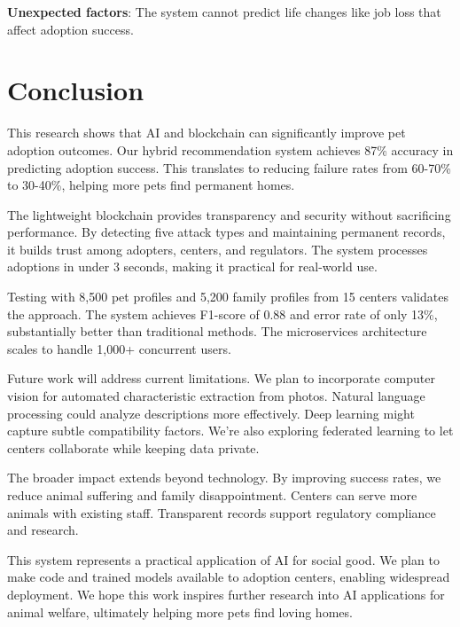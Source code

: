 \documentclass[conference]{IEEEtran}
\begin{document}
\textbf{Unexpected factors}: The system cannot predict life changes like job loss that affect adoption success.

\section{Conclusion}

This research shows that AI and blockchain can significantly improve pet adoption outcomes. Our hybrid recommendation system achieves 87\% accuracy in predicting adoption success. This translates to reducing failure rates from 60-70\% to 30-40\%, helping more pets find permanent homes.

The lightweight blockchain provides transparency and security without sacrificing performance. By detecting five attack types and maintaining permanent records, it builds trust among adopters, centers, and regulators. The system processes adoptions in under 3 seconds, making it practical for real-world use.

Testing with 8,500 pet profiles and 5,200 family profiles from 15 centers validates the approach. The system achieves F1-score of 0.88 and error rate of only 13\%, substantially better than traditional methods. The microservices architecture scales to handle 1,000+ concurrent users.

Future work will address current limitations. We plan to incorporate computer vision for automated characteristic extraction from photos. Natural language processing could analyze descriptions more effectively. Deep learning might capture subtle compatibility factors. We're also exploring federated learning to let centers collaborate while keeping data private.

The broader impact extends beyond technology. By improving success rates, we reduce animal suffering and family disappointment. Centers can serve more animals with existing staff. Transparent records support regulatory compliance and research.

This system represents a practical application of AI for social good. We plan to make code and trained models available to adoption centers, enabling widespread deployment. We hope this work inspires further research into AI applications for animal welfare, ultimately helping more pets find loving homes.
\end{document}
